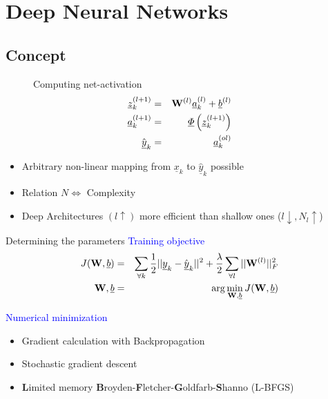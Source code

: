   
\section{Deep Neural Networks}%
	\subsection{Concept}		
		\begin{minipage}[t]{0.48\linewidth}
		\begin{figure}
			Computing net-activation
			\begin{eqnarray}
				\underline{z}^{(l+1)}_k &=& {\bf W}^{(l)}\underline{a}^{(l)}_k + \underline{b}^{(l)} \nonumber
\\
				\underline{a}^{(l+1)}_k &=& \underline{\Phi} \left ( \underline{z}^{(l+1)}_k \right )
\nonumber\\
				\hat{\underline{y}}_k &=& \underline{a}^{(ol)}_k \nonumber
			\end{eqnarray}
		\end{figure}
		\end{minipage}\hfill
		\begin{minipage}[t]{0.48\linewidth}
			\begin{itemize}
				\item Arbitrary non-linear mapping from $\underline{x}_k$ to  $\hat{\underline{y}}_k$ possible
				\item Relation $N \Leftrightarrow$ Complexity
				\item Deep Architectures $(l \uparrow)$ more efficient than shallow ones ($l\downarrow,
N_l\uparrow$)
			\end{itemize}
		\end{minipage}
		
	
	\begin{frame}[t]{Determining the parameters}
		\textcolor{blue}{\Large Training objective}
			\begin{eqnarray}
				J({\bf W}, \underline{b}) &=& \sum_{\forall k} \frac{1}{2} ||\underline{y}_k -
\hat{\underline{y}}_k||^2 + \frac{\lambda}{2} \sum_{\forall l} ||{\bf W}^{(l)}||_F^2 \\
				{\bf W}, \underline{b} &=& \arg \min_{{\bf W}, \underline{b}} J({\bf W}, \underline{b})
			\end{eqnarray}
			
		\textcolor{blue}{\Large Numerical minimization}		
		\begin{itemize}
			\item Gradient calculation with Backpropagation
			\item Stochastic gradient descent
			\item {\bf L}imited memory {\bf B}royden-{\bf F}letcher-{\bf G}oldfarb-{\bf S}hanno (L-BFGS)
		\end{itemize}	
	\end{frame}
	
